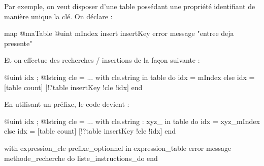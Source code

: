 {{{%
%
%


Par exemple, on veut disposer d'une table possédant une propriété identifiant de manière unique la clé. On déclare :
\begin{galgascode}
map @maTable {
  @uint mIndex
  insert insertKey error message "entree deja presente"
}
\end{galgascode}

Et on effectue des recherches / insertions de la façon suivante :
\begin{galgascode}
@uint idx ;
@lstring cle = ...
with cle.string in table do
  idx = mIndex
else
  idx = [table count]
  [!?table insertKey !cle !idx]
end
\end{galgascode}

En utilisant un préfixe, le code devient :
\begin{galgascode}
@uint idx ;
@lstring cle = ...
with cle.string : xyz_ in table do
  idx = xyz_mIndex
else
  idx = [table count]
  [!?table insertKey !cle !idx]
end
\end{galgascode}






\begin{galgascode}
with expression_cle prefixe_optionnel in expression_table
error message methode_recherche
do liste_instructions_do
end
\end{galgascode}

}}}
